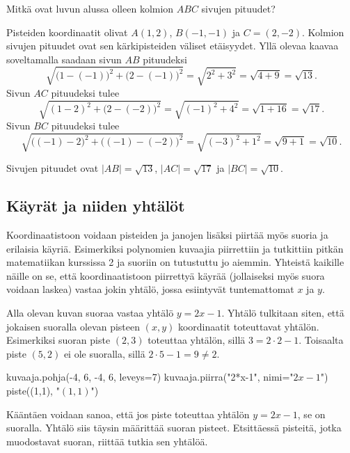 \begin{esimerkki}
Mitkä ovat luvun alussa olleen kolmion $ABC$ sivujen pituudet?

\begin{esimratk}
Pisteiden koordinaatit olivat $A(1, 2)$, $B(-1, -1)$ ja $C=(2, -2)$.
Kolmion sivujen pituudet ovat sen kärkipisteiden väliset etäisyydet.
Yllä olevaa kaavaa soveltamalla saadaan sivun $AB$ pituudeksi
\[
\sqrt{\bigl(1-(-1)\bigr)^2+\bigl(2-(-1)\bigr)^2}=\sqrt{2^2+3^2}=\sqrt{4+9}=\sqrt{13}.
\]
Sivun $AC$ pituudeksi tulee
\[
\sqrt{(1-2)^2+\bigl(2-(-2)\bigr)^2}=\sqrt{(-1)^2+4^2}=\sqrt{1+16}=\sqrt{17}.
\]
Sivun $BC$ pituudeksi tulee
\[
\sqrt{\bigl((-1)-2\bigr)^2+\bigl((-1)-(-2)\bigr)^2}=\sqrt{(-3)^2+1^2}=\sqrt{9+1}=\sqrt{10}.
\]
\end{esimratk}

\begin{esimvast}
Sivujen pituudet ovat $|AB|=\sqrt{13}$, $|AC|=\sqrt{17}$ ja $|BC|=\sqrt{10}$.
\end{esimvast}
\end{esimerkki}

\subsection{Käyrät ja niiden yhtälöt}

Koordinaatistoon voidaan pisteiden ja janojen lisäksi piirtää myös suoria ja erilaisia käyriä.
Esimerkiksi polynomien kuvaajia piirrettiin ja tutkittiin pitkän matematiikan kurssissa 2 ja suoriin on tutustuttu jo aiemmin.
Yhteistä kaikille näille on se, että koordinaatistoon piirrettyä käyrää (jollaiseksi myös suora voidaan laskea) vastaa jokin yhtälö, jossa esiintyvät tuntemattomat $x$ ja $y$.

Alla olevan kuvan suoraa vastaa yhtälö $y=2x-1$.
Yhtälö tulkitaan siten, että jokaisen suoralla olevan pisteen $(x, y)$ koordinaatit toteuttavat yhtälön.
Esimerkiksi suoran piste $(2, 3)$ toteuttaa yhtälön, sillä $3=2\cdot 2-1$.
Toisaalta piste $(5, 2)$ ei ole suoralla, sillä $2\cdot 5-1=9\neq 2$.


\begin{kuva}
	kuvaaja.pohja(-4, 6, -4, 6, leveys=7)
	kuvaaja.piirra("2*x-1", nimi="$2x-1$")
	piste((1,1), "$(1, 1)$")
\end{kuva}

Kääntäen voidaan sanoa, että jos piste toteuttaa yhtälön $y=2x-1$, se on suoralla.
Yhtälö siis täysin määrittää suoran pisteet.
Etsittäessä pisteitä, jotka muodostavat suoran, riittää tutkia sen yhtälöä.

